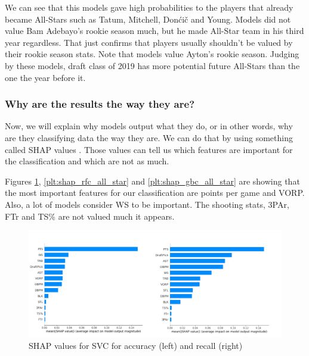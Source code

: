 \documentclass[a4paper]{article}
\begin{document}
We can see that this models gave high probabilities to the players that already became All-Stars such as Tatum, Mitchell, Donćič and Young. Models did not value Bam Adebayo's rookie season much, but he made All-Star team in his third year regardless. That just confirms that players usually shouldn't be valued by their rookie season stats. Note that models value Ayton's  rookie season. Judging by these models, draft class of 2019 has more potential future All-Stars than the one the year before it.

\subsubsection{Why are the results the way they are?}
\label{subsubsec:shap_values_all_star}

Now, we will explain why models output what they do, or in other words, why are they classifying data the way they are. We can do that by using something called SHAP values \cite{shap}. Those values can tell us which features are important for the classification and which are not as much. 

Figures \ref{plt:shap_svm_all_star}, \ref{plt:shap_rfc_all_star} and \ref{plt:shap_gbc_all_star} are showing that the most important features for our classification are points per game and VORP. Also, a lot of models consider WS to be important. The shooting stats, 3PAr, FTr and TS\% are not valued much it appears.

\begin{figure}[h!]
\begin{center}
\includegraphics[scale=0.3]{svm_shap.png}
\end{center}
\caption{SHAP values for SVC for accuracy (left) and recall (right)}
\label{plt:shap_svm_all_star}
\end{figure}
\end{document}

